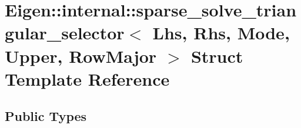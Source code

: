 \hypertarget{struct_eigen_1_1internal_1_1sparse__solve__triangular__selector_3_01_lhs_00_01_rhs_00_01_mode_00_01_upper_00_01_row_major_01_4}{}\section{Eigen\+:\+:internal\+:\+:sparse\+\_\+solve\+\_\+triangular\+\_\+selector$<$ Lhs, Rhs, Mode, Upper, Row\+Major $>$ Struct Template Reference}
\label{struct_eigen_1_1internal_1_1sparse__solve__triangular__selector_3_01_lhs_00_01_rhs_00_01_mode_00_01_upper_00_01_row_major_01_4}
\subsection*{Public Types}
